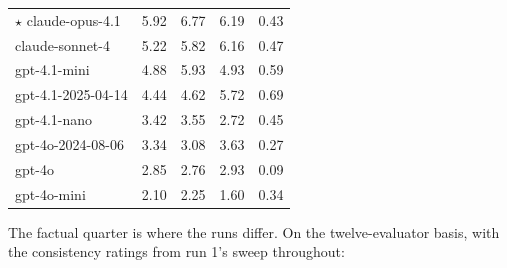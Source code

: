 \documentclass{article}
\begin{document}
\begin{table}[H]
\begin{center}
\begin{tabular}{@{}lrrrr@{}}
\ensuremath{\star} claude-opus-4.1 &\cellcolor[HTML]{279BC1}\textcolor[HTML]{EEF3F8}{5.92}&\cellcolor[HTML]{1F7CB6}\textcolor[HTML]{EEF3F8}{6.77}&\cellcolor[HTML]{1F93C0}\textcolor[HTML]{EEF3F8}{6.19}&\cellcolor[HTML]{64C3BF}\textcolor[HTML]{1A1A1A}{0.43} \\
claude-sonnet-4 &\cellcolor[HTML]{3BAFC3}\textcolor[HTML]{1A1A1A}{5.22}&\cellcolor[HTML]{299EC1}\textcolor[HTML]{EEF3F8}{5.82}&\cellcolor[HTML]{2094C0}\textcolor[HTML]{EEF3F8}{6.16}&\cellcolor[HTML]{50BCC2}\textcolor[HTML]{1A1A1A}{0.47} \\
gpt-4.1-mini &\cellcolor[HTML]{47B8C3}\textcolor[HTML]{1A1A1A}{4.88}&\cellcolor[HTML]{269AC1}\textcolor[HTML]{EEF3F8}{5.93}&\cellcolor[HTML]{44B7C3}\textcolor[HTML]{1A1A1A}{4.93}&\cellcolor[HTML]{279BC1}\textcolor[HTML]{EEF3F8}{0.59} \\
gpt-4.1-2025-04-14 &\cellcolor[HTML]{5DC0C0}\textcolor[HTML]{1A1A1A}{4.44}&\cellcolor[HTML]{54BDC1}\textcolor[HTML]{1A1A1A}{4.62}&\cellcolor[HTML]{2CA1C2}\textcolor[HTML]{EEF3F8}{5.72}&\cellcolor[HTML]{2076B4}\textcolor[HTML]{EEF3F8}{0.69} \\
gpt-4.1-nano &\cellcolor[HTML]{92D4B9}\textcolor[HTML]{1A1A1A}{3.42}&\cellcolor[HTML]{8BD1BA}\textcolor[HTML]{1A1A1A}{3.55}&\cellcolor[HTML]{BAE4B5}\textcolor[HTML]{1A1A1A}{2.72}&\cellcolor[HTML]{5ABFC0}\textcolor[HTML]{1A1A1A}{0.45} \\
gpt-4o-2024-08-06 &\cellcolor[HTML]{97D6B9}\textcolor[HTML]{1A1A1A}{3.34}&\cellcolor[HTML]{A6DCB7}\textcolor[HTML]{1A1A1A}{3.08}&\cellcolor[HTML]{86D0BA}\textcolor[HTML]{1A1A1A}{3.63}&\cellcolor[HTML]{BBE5B5}\textcolor[HTML]{1A1A1A}{0.27} \\
gpt-4o &\cellcolor[HTML]{B3E1B6}\textcolor[HTML]{1A1A1A}{2.85}&\cellcolor[HTML]{B8E3B5}\textcolor[HTML]{1A1A1A}{2.76}&\cellcolor[HTML]{AEDFB6}\textcolor[HTML]{1A1A1A}{2.93}&\cellcolor[HTML]{F2FABC}\textcolor[HTML]{1A1A1A}{0.09} \\
gpt-4o-mini &\cellcolor[HTML]{D3EEB3}\textcolor[HTML]{1A1A1A}{2.10}&\cellcolor[HTML]{CFECB3}\textcolor[HTML]{1A1A1A}{2.25}&\cellcolor[HTML]{E2F4B2}\textcolor[HTML]{1A1A1A}{1.60}&\cellcolor[HTML]{93D5B9}\textcolor[HTML]{1A1A1A}{0.34} \\
\bottomrule
\end{tabular}
\end{center}
\end{table}

The factual quarter is where the runs differ. On the twelve-evaluator basis, with the consistency ratings from run 1's sweep throughout:
\end{document}
